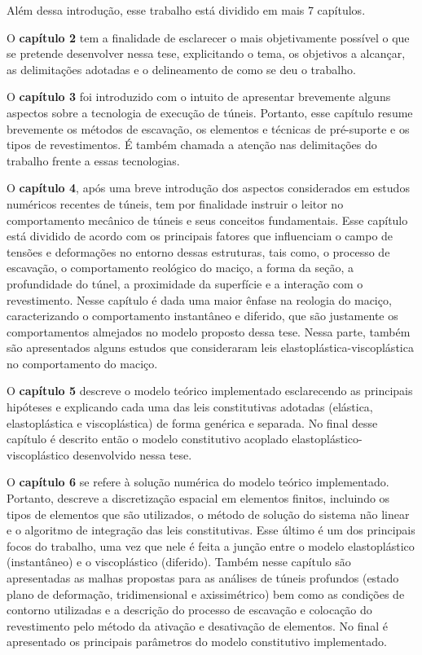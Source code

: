 Além dessa introdução, esse trabalho está dividido em mais 7 capítulos.

O \textbf{capítulo 2} tem a finalidade de esclarecer o mais objetivamente possível o que se pretende desenvolver nessa tese, explicitando o tema, os objetivos a alcançar, as delimitações  adotadas e o delineamento de como se deu o trabalho.

O \textbf{capítulo 3} foi introduzido com o intuito de apresentar brevemente alguns aspectos sobre a tecnologia de execução de túneis. Portanto, esse capítulo resume brevemente os métodos de escavação, os elementos e técnicas de pré-suporte e os tipos de revestimentos. É também chamada a atenção nas delimitações do trabalho frente a essas tecnologias. 

O \textbf{capítulo 4}, após uma breve introdução dos aspectos considerados em estudos numéricos recentes de túneis, tem por finalidade instruir o leitor no comportamento mecânico de túneis e seus conceitos fundamentais. Esse capítulo está dividido de acordo com os principais fatores que influenciam o campo de tensões e deformações no entorno dessas estruturas, tais como, o processo de escavação, o comportamento reológico do maciço, a forma da seção, a profundidade do túnel, a proximidade da superfície e a interação com o revestimento. Nesse capítulo é dada uma maior ênfase na reologia do maciço, caracterizando o comportamento instantâneo e diferido, que são justamente os comportamentos almejados no modelo proposto dessa tese. Nessa parte, também são apresentados alguns estudos que consideraram leis elastoplástica-viscoplástica no comportamento do maciço.

O \textbf{capítulo 5} descreve o modelo teórico implementado esclarecendo as principais hipóteses e explicando cada uma das leis constitutivas adotadas (elástica, elastoplástica e viscoplástica) de forma genérica e separada. No final desse capítulo é descrito então o modelo constitutivo acoplado elastoplástico-viscoplástico desenvolvido nessa tese.

O \textbf{capítulo 6} se refere à solução numérica do modelo teórico implementado. Portanto, descreve a discretização espacial em elementos finitos, incluindo os tipos de elementos que são utilizados, o método de solução do sistema não linear e o algoritmo de integração das leis constitutivas. Esse último é um dos principais focos do trabalho, uma vez que nele é feita a junção entre o modelo elastoplástico (instantâneo) e o viscoplástico (diferido). Também nesse capítulo são apresentadas as malhas propostas para as análises de túneis profundos (estado plano de deformação, tridimensional e axissimétrico) bem como as condições de contorno utilizadas e a descrição do processo de escavação e colocação do revestimento pelo método da ativação e desativação de elementos. No final é apresentado os principais parâmetros do modelo constitutivo implementado.

